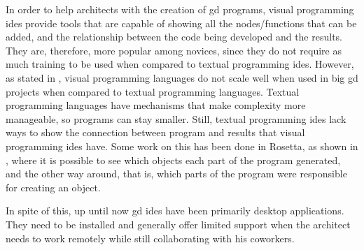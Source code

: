 In order to help architects with the creation of \gls{gd} programs, visual programming \glspl{ide} provide tools that are capable of showing all the nodes/functions that can be added, and the relationship between the code being developed and the results.
They are, therefore, more popular among novices, since they do not require as much training to be used when compared to textual programming \glspl{ide}.
However, as stated in \cite{leitao2012programming}, visual programming languages do not scale well when used in big \gls{gd} projects when compared to textual programming languages.
Textual programming languages have mechanisms that make complexity more manageable, so programs can stay smaller.
Still, textual programming \glspl{ide} lack ways to show the connection between program and results that visual programming \glspl{ide} have.
Some work on this has been done in Rosetta, as shown in \cite{de2012modern}, where it is possible to see which objects each part of the program generated, and the other way around, that is, which parts of the program were responsible for creating an object.

In spite of this, up until now \gls{gd} \glspl{ide} have been primarily desktop applications.
They need to be installed and generally offer limited support when the architect needs to work remotely while still collaborating with his coworkers.





